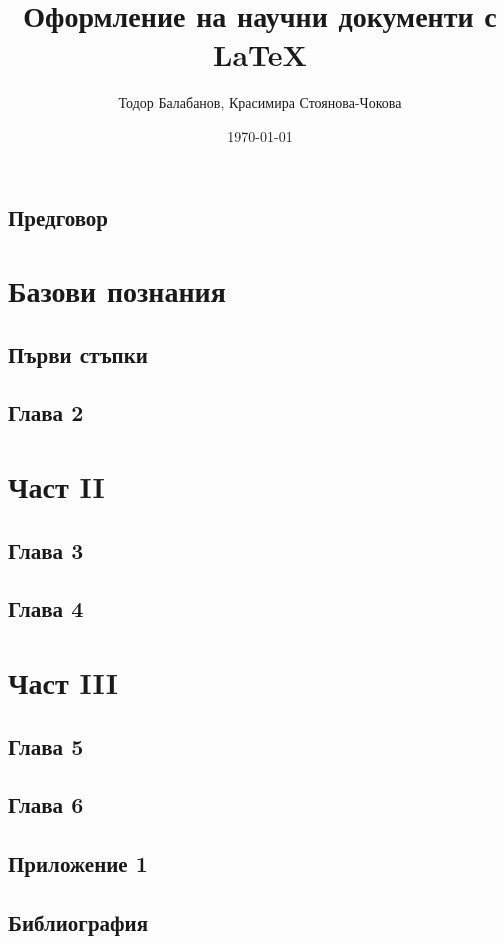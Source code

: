 \documentclass{book}
\title{Оформление на научни документи с LaTeX}
\author{Тодор Балабанов, Красимира Стоянова-Чокова}
\date{\today}
\begin{document}
\maketitle

\frontmatter

\tableofcontents
\listoffigures

\mainmatter

\chapter*{Предговор}


\part{Базови познания}

\chapter{Първи стъпки}


\chapter{Глава 2}

\part{Част II}

\chapter{Глава 3}

\chapter{Глава 4}

\part{Част III}

\chapter{Глава 5}

\chapter{Глава 6}

\appendix

\chapter{Приложение 1}

\backmatter

\chapter{Библиография}

\end{document}
